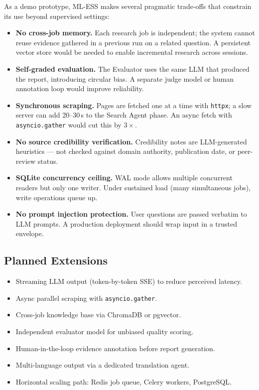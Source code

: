 \documentclass[10pt, twocolumn]{article}
\begin{document}
As a demo prototype, ML-ESS makes several pragmatic trade-offs that constrain
its use beyond supervised settings:

\begin{itemize}
  \item \textbf{No cross-job memory.} Each research job is independent; the
    system cannot reuse evidence gathered in a previous run on a related
    question. A persistent vector store would be needed to enable incremental
    research across sessions.
  \item \textbf{Self-graded evaluation.} The Evaluator uses the same LLM
    that produced the report, introducing circular bias. A separate judge
    model or human annotation loop would improve reliability.
  \item \textbf{Synchronous scraping.} Pages are fetched one at a time
    with \texttt{httpx}; a slow server can add 20–30\,s to the Search Agent
    phase. An async fetch with \texttt{asyncio.gather} would cut this by
    $3\times$.
  \item \textbf{No source credibility verification.} Credibility notes are
    LLM-generated heuristics — not checked against domain authority, publication
    date, or peer-review status.
  \item \textbf{SQLite concurrency ceiling.} WAL mode allows multiple
    concurrent readers but only one writer. Under sustained load (many
    simultaneous jobs), write operations queue up.
  \item \textbf{No prompt injection protection.} User questions are passed
    verbatim to LLM prompts. A production deployment should wrap input in a
    trusted envelope.
\end{itemize}

\subsection{Planned Extensions}

\begin{itemize}
  \item Streaming LLM output (token-by-token SSE) to reduce perceived latency.
  \item Async parallel scraping with \texttt{asyncio.gather}.
  \item Cross-job knowledge base via ChromaDB or pgvector.
  \item Independent evaluator model for unbiased quality scoring.
  \item Human-in-the-loop evidence annotation before report generation.
  \item Multi-language output via a dedicated translation agent.
  \item Horizontal scaling path: Redis job queue, Celery workers, PostgreSQL.
\end{itemize}
\end{document}
